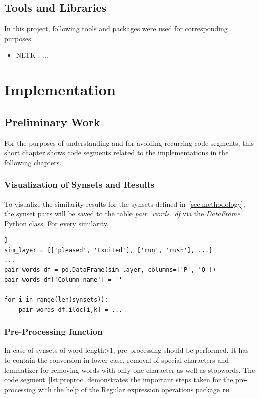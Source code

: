 \documentclass[conference]{IEEEtran}
\begin{document}
\subsection{Tools and Libraries}
In this project, following tools and packages were used for corresponding purposes:
\begin{itemize}
\item NLTK : ...
\end{itemize}

\section{Implementation}\label{sec:implementation}

\subsection{Preliminary Work}
For the purposes of understanding and for avoiding recurring code segments, this short chapter shows code segments related to the implementations in the following chapters.

\subsubsection{Visualization of Synsets and Results}
To visualize the similarity results for the synsets defined in~\ref{sec:methodology}, the synset pairs will be saved to the table \textit{pair\_words\_df} via the \textit{DataFrame} Python class. For every similarity, 

\begin{lstlisting}[frame=single, label=lst:table, caption={}, captionpos=b]]
sim_layer = [['pleased', 'Excited'], ['run', 'rush'], ...]
...
pair_words_df = pd.DataFrame(sim_layer, columns=['P', 'Q'])
pair_words_df['Column name'] = ''

for i in range(len(synsets)):
    pair_words_df.iloc[i,k] = ...
\end{lstlisting}

\subsubsection{Pre-Processing function}\label{sec:preproc}
In case of synsets of word length>1,  pre-processing should be performed. It has to contain the conversion in lower case, removal of special characters and lemmatizer for removing words with only one character as well as stopwords. The code segment~\ref{lst:preproc} demonstrates the important steps taken for the pre-processing with the help of the Regular expression operations package \textbf{re}.
\end{document}
